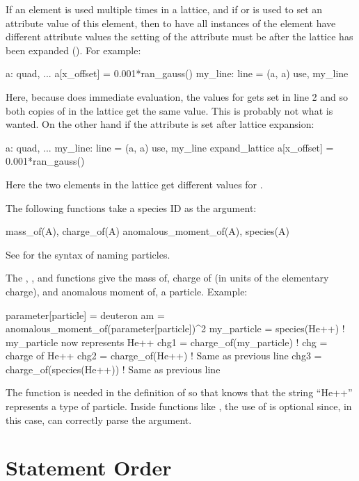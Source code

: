 {{{{{
If an element is used multiple times in a lattice, and if  or  is used to set
an attribute value of this element, then to have all instances of the element have different
attribute values the setting of the attribute must be after the lattice has been expanded
(). For example:
\begin{example}
  a: quad, ... 
  a[x_offset] = 0.001*ran_gauss()
  my_line: line = (a, a)
  use, my_line
\end{example}
Here, because \bmad does immediate evaluation, the  values for  gets set in line
2 and so both copies of  in the lattice get the same value. This is probably not what is
wanted.  On the other hand if the attribute is set after lattice expansion:
\begin{example}
  a: quad, ...
  my_line: line = (a, a)
  use, my_line
  expand_lattice
  a[x_offset] = 0.001*ran_gauss()
\end{example}
Here the two  elements in the lattice get different values for .

The following functions take a species ID as the argument:
\begin{example}
  mass_of(A),              charge_of(A)
  anomalous_moment_of(A),  species(A)
\end{example}
See  for the syntax of naming particles.

The , , and  functions give the mass of, charge of
(in units of the elementary charge), and anomalous moment of, a particle.  Example:
\begin{example}
  parameter[particle] = deuteron
  am = anomalous_moment_of(parameter[particle])^2
  my_particle = species(He++)      ! my_particle now represents He++
  chg1 = charge_of(my_particle)    ! chg = charge of He++
  chg2 = charge_of(He++)           ! Same as previous line
  chg3 = charge_of(species(He++))  ! Same as previous line
\end{example}
The  function is needed in the definition of  so that \bmad knows that
the string ``He++'' represents a type of particle. Inside functions like , the use of
 is optional since, in this case, \bmad can correctly parse the argument.

\section{Statement Order}
\label{s:state.order}

}}}}}
